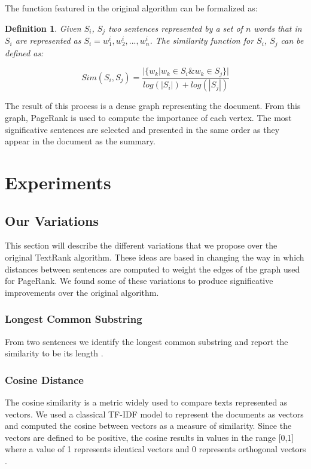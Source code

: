 \documentclass{llncs}
\newtheorem{definicion}{Definition}
\begin{document}
The function featured in the original algorithm can be formalized as:

\begin{definicion}
Given $S_i$, $S_j$ two sentences represented by a set of $n$ words that in 
$S_i$ are represented as $S_i = w_{1}^{i}, w_{2}^{i},..., w_{n}^{i}$. The similarity function for $S_i$, $S_j$ can be defined as:


\begin{equation}
Sim(S_{i},S_{j}) = \frac{ | \{   w_{k} | w_{k} \in S_{i} \& w_{k} \in S_{j}   \}  | }    
                              {  log(|S_{i}|) + log(|S_{j}|)  }
\end{equation}


\end{definicion}

The result of this process is a dense graph representing the document. From this graph, PageRank is used to compute the importance of each vertex. The most significative sentences are selected and presented in the same order as they appear in the document as the summary.


\section{Experiments}

\subsection{Our Variations}
This section will describe the different variations that we propose over the original TextRank algorithm. These ideas are based in changing the way in which distances between sentences are computed to weight the edges of the graph used for PageRank. We found some of these variations to produce significative improvements over the original algorithm.

\subsubsection{Longest Common Substring}
From two sentences we identify the longest common substring and report the similarity to be its length \cite{gusfield}.

\subsubsection{Cosine Distance}
The cosine similarity is a metric widely used to compare texts represented as vectors. We used a classical TF-IDF model to represent the documents as vectors and computed the cosine between vectors as a measure of similarity. Since the vectors are defined to be positive, the cosine results in values in the range [0,1] where a value of 1 represents identical vectors and 0 represents orthogonal vectors \cite{singhal}.
\end{document}
